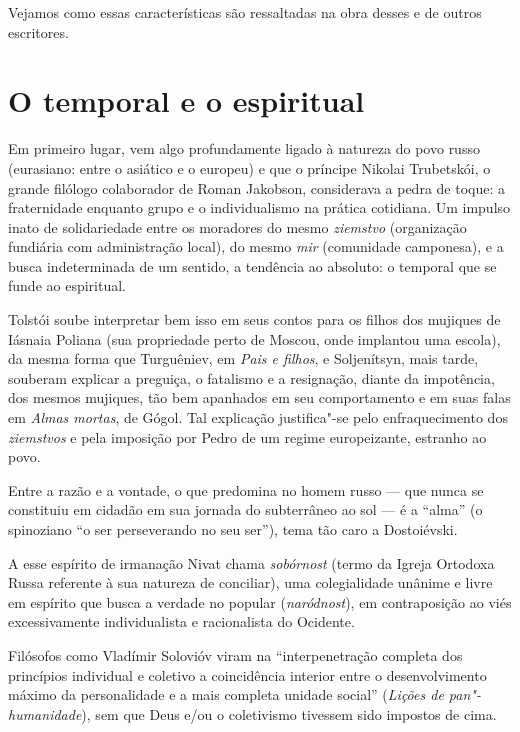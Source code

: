 Vejamos como essas características são ressaltadas na obra desses e de
outros escritores.

\pagebreak

\section{\uppercase{O} temporal e o espiritual}

Em primeiro lugar, vem algo profundamente ligado à natureza do povo
russo (eurasiano: entre o asiático e o europeu) e que o príncipe Nikolai
Trubetskói, o grande filólogo colaborador de Roman Jakobson, considerava
a pedra de toque: a fraternidade enquanto grupo e o individualismo na
prática cotidiana. Um impulso inato de solidariedade entre os moradores
do mesmo \emph{ziemstvo} (organização fundiária com administração
local), do mesmo \emph{mir} (comunidade camponesa), e a busca indeterminada de um sentido, a tendência ao absoluto: o temporal que se funde ao espiritual.

Tolstói soube interpretar bem isso em seus contos para os filhos dos mujiques de Iásnaia Poliana (sua propriedade perto de Moscou, onde implantou uma escola), da mesma forma que Turguêniev, em \emph{Pais e filhos}, e Soljenítsyn, mais tarde, souberam explicar a preguiça, o fatalismo e a resignação, diante da impotência, dos mesmos mujiques, tão bem apanhados em seu comportamento e em suas falas em \emph{Almas mortas}, de Gógol. Tal explicação justifica"-se pelo enfraquecimento dos \emph{ziemstvos} e pela imposição por Pedro  de um regime europeizante, estranho ao povo.

Entre a razão e a vontade, o que predomina no homem russo --- que nunca se constituiu em cidadão em sua jornada do subterrâneo ao sol --- é a ``alma'' (o spinoziano ``o ser perseverando no seu ser''), tema tão caro a Dostoiévski.

A esse espírito de irmanação Nivat chama \emph{sobórnost} (termo da Igreja Ortodoxa Russa referente à sua natureza de conciliar), uma colegialidade unânime e livre em espírito que busca a verdade no popular (\emph{naródnost}), em contraposição ao viés excessivamente individualista e racionalista do Ocidente.

Filósofos como Vladímir Solovióv viram na ``interpenetração completa dos princípios individual e coletivo a coincidência interior entre o desenvolvimento máximo da personalidade e a mais completa unidade social'' (\emph{Lições de pan"-humanidade}), sem que Deus e/ou o coletivismo tivessem sido impostos de cima.

